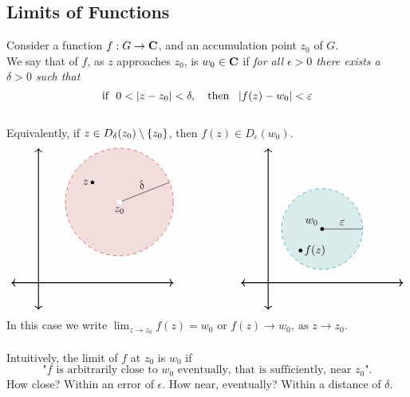 \bigskip

\subsection{Limits of Functions}

\begin{definition}\label{limdef}
Consider a function $f:G \to \mathbf C$, and an accumulation point $z_0$ of $G$.\\[0.5em]
We say that  of $f$, as $z$ approaches $z_0$, is $w_0 \in \mathbf C$ if \emph{for all $\epsilon > 0$ there exists a $\delta > 0$ such that
\[\text{if }\ 0 < \left\lvert z - z_0\right\rvert < \delta,\quad \text{then }\ \left\lvert f(z) - w_0\right\rvert<\varepsilon\]}\\
Equivalently, if $z \in D_{\delta}(z_0)\setminus \left\{z_0\right\}$, then $f(z) \in D_\epsilon(w_0)$.
\[\begin{tikzpicture}[scale=0.85]
    \draw[<->,thick] (-1,0)--(5,0);
	\draw[<->,thick] (0,-1)--(0,5);
	\filldraw[firebrick,fill opacity=1/7,dashed](3,3) circle (2);
    \draw[firebrick,dotted](3,3) circle (3pt);    
    \draw[](3,3)--(4.86,3.735) node[sloped,midway,above]{$\delta$};
    \fill[white] (3,3) circle (3pt) node[below,yshift=-1pt]{\color{black}$z_0$};
    \fill (2,3.735) circle (2pt) node[left]{$z$};
  \end{tikzpicture}
  \qquad\qquad\qquad
  \begin{tikzpicture}[scale=0.85]
    \draw[<->,thick] (-1,0)--(5,0);
	\draw[<->,thick] (0,-1)--(0,5);
	\filldraw[teal,fill opacity=1/7,dashed](2,2) circle (1.5);
    \draw[](2,2)--(3.5,2) node[sloped,midway,above]{$\epsilon$};
    \fill (2,2) circle (2pt) node[above left]{$w_0$};
    \fill (1.2,1.2) circle (2pt) node[right]{$f(z)$};
  \end{tikzpicture}\]
In this case we write $\lim_{z \to z_0}f(z) = w_0$ or $f(z) \to w_0,\ \text{as } z \to z_0$.\\
\\
Intuitively, the limit of $f$ at $z_0$ is $w_0$ if \[\text{"$f$ is arbitrarily close to $w_0$ eventually, that is sufficiently, near $z_0$".}\] How close? Within an error of $\epsilon$. How near, eventually? Within a distance of $\delta$.
\end{definition}

